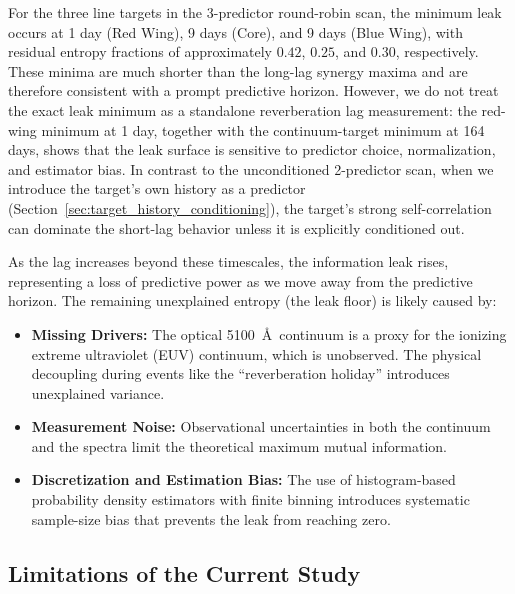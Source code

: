 \documentclass[fleqn,usenatbib]{mnras}
\begin{document}
For the three line targets in the 3-predictor round-robin scan, the minimum leak occurs at 1 day (Red Wing), 9 days (Core), and 9 days (Blue Wing), with residual entropy fractions of approximately $0.42$, $0.25$, and $0.30$, respectively. These minima are much shorter than the long-lag synergy maxima and are therefore consistent with a prompt predictive horizon. However, we do not treat the exact leak minimum as a standalone reverberation lag measurement: the red-wing minimum at 1 day, together with the continuum-target minimum at 164 days, shows that the leak surface is sensitive to predictor choice, normalization, and estimator bias. In contrast to the unconditioned 2-predictor scan, when we introduce the target's own history as a predictor (Section~\ref{sec:target_history_conditioning}), the target's strong self-correlation can dominate the short-lag behavior unless it is explicitly conditioned out.

As the lag increases beyond these timescales, the information leak rises, representing a loss of predictive power as we move away from the predictive horizon. The remaining unexplained entropy (the leak floor) is likely caused by:
\begin{itemize}
\item \textbf{Missing Drivers:} The optical 5100~\AA\ continuum is a proxy for the ionizing extreme ultraviolet (EUV) continuum, which is unobserved. The physical decoupling during events like the ``reverberation holiday'' introduces unexplained variance.
\item \textbf{Measurement Noise:} Observational uncertainties in both the continuum and the spectra limit the theoretical maximum mutual information.
\item \textbf{Discretization and Estimation Bias:} The use of histogram-based probability density estimators with finite binning introduces systematic sample-size bias that prevents the leak from reaching zero.
\end{itemize}

\subsection{Limitations of the Current Study}
\label{sec:limitations}
\end{document}
